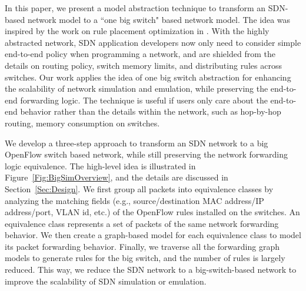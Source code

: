 In this paper, we present a model abstraction technique to transform an SDN-based network model to a ``one big switch" based network model. The idea was inspired by the work on rule placement optimization in \cite{OneBigSwitchAbstraction}. With the highly abstracted network, SDN application developers now only need to consider simple end-to-end policy when programming a network, and are shielded from the details on routing policy, switch memory limits, and distributing rules across switches. Our work applies the idea of one big switch abstraction for enhancing the scalability of network simulation and emulation, while preserving the end-to-end forwarding logic. The technique is useful if users only care about the end-to-end behavior rather than the details within the network, such as hop-by-hop routing, memory consumption on switches. 

We develop a three-step approach to transform an SDN network to a big OpenFlow switch based network, while still preserving the network forwarding logic equivalence. The high-level idea is illustrated in Figure~\ref{Fig:BigSimOverview}, and the details are discussed in Section~\ref{Sec:Design}. We first group all packets into equivalence classes by analyzing the matching fields (e.g., source/destination MAC address/IP address/port, VLAN id, etc.) of the OpenFlow rules installed on the switches. An equivalence class represents a set of packets of the same network forwarding behavior. We then create a graph-based model for each equivalence class to model its packet forwarding behavior. Finally, we traverse all the forwarding graph models to generate rules for the big switch, and the number of rules is largely reduced. This way, we reduce the SDN network to a big-switch-based network to improve the scalability of SDN simulation or emulation.

